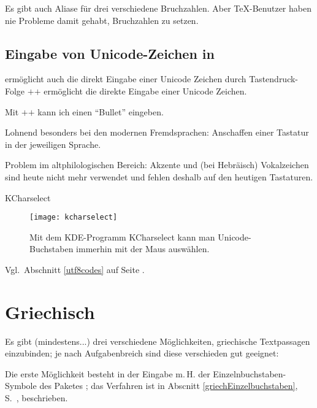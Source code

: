 Es gibt auch Aliase für drei verschiedene Bruchzahlen. Aber
\TeX{}-Benutzer haben nie Probleme damit gehabt, Bruchzahlen
zu setzen.

\subsection{Eingabe von Unicode-Zeichen in }
\label{unicodeviagedit}
 ermöglicht auch die direkt Eingabe einer Unicode
Zeichen durch Tastendruck-Folge %
\hbox{\Shift$+$\Ctrl$+$}%
%
\Return{}%
\space%
ermöglicht die direkte Eingabe einer Unicode
Zeichen.

Mit %
\hbox{\Shift$+$\Ctrl$+$}%
%
\Return{} %
kann ich einen \enquote{Bullet} eingeben.


Lohnend besonders bei den modernen Fremdsprachen: Anschaffen einer Tastatur in der jeweiligen
Sprache.

Problem im altphilologischen Bereich: Akzente und (bei Hebräisch) Vokalzeichen sind heute
nicht mehr verwendet und fehlen deshalb auf den heutigen Tastaturen.

KCharselect

\begin{figure}
 \texttt{[image: kcharselect]}
 \caption{Mit dem KDE-Programm KCharselect kann man Unicode-Buchstaben immerhin mit der Maus
 auswählen.}
\end{figure}


Vgl.\ Abschnitt \ref{utf8codes} auf Seite \pageref{utf8codes}.

\section{Griechisch}

Es gibt (mindestens...) drei verschiedene Möglichkeiten, griechische Textpassagen einzubinden;
je nach Aufgabenbreich sind diese verschieden gut geeignet:



Die erste Möglichkeit besteht in der Eingabe m.\,H. der Einzelnbuchstaben-Symbole des Paketes
; das Verfahren ist in Abscnitt \ref{griechEinzelbuchstaben},
S.~\pageref{griechEinzelbuchstaben}, beschrieben.

